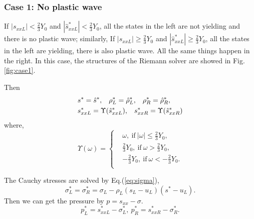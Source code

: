 \documentclass{article}
\numberwithin{equation}{section}
\numberwithin{table}{section}
\begin{document}
\subsubsection{Case 1: No plastic wave}\label{sec:case1}
%
If $|s_{xxL}|<\frac{2}{3}Y_0$ and $|\hat{s}_{xxL}^*| < \frac{2}{3}Y_0$, all the states in the left are not yielding and there is no plastic wave; similarly, If $|s_{xxL}| \ge \frac{2}{3}Y_0$ and $|\hat{s}_{xxL}^*| \ge  \frac{2}{3}Y_0$, all the states in the left are yielding, there is also plastic wave. All the same things happen in the right.
In this case, the structures  of the Riemann solver are showed in Fig.\ref{fig:case1}.

Then
\begin{align}
&  s^* = \hat{s}^*,\hspace{0.3cm} \rho^*_L = \hat{\rho}_L^*, \hspace{0.3cm} \rho_R^* = \hat{\rho}_R^*,\\
&  s_{xxL}^*  = \Upsilon(\hat{s}_{xxL}^*),\hspace{0.3cm} s_{xxR}^*  = \Upsilon(\hat{s}_{xxR}^*)
\end{align}
where,
\begin{equation}\label{eq:upsilon}
  \Upsilon(\omega) = \left\{ \begin{aligned}
	  &\omega, \  \text{if} \  |\omega| \le \frac{2}{3}Y_0,\\
	  &\frac{2}{3}Y_0,  \ \text{if} \  \omega > \frac{2}{3}Y_0,\\
	 &-\frac{2}{3}Y_0,  \  \text{if} \ \omega < -\frac{2}{3}Y_0.\\
 \end{aligned}\right.
 \end{equation}

 The Cauchy stresses are solved  by Eq.(\ref{eq:sigma}),
\begin{equation*}
  \sigma_L^*=\sigma_R^*=\sigma_L -\rho_L (s_L-u_L)(s^*-u_L).
\end{equation*}
 Then we can get the pressure by $p =s_{xx}-\sigma$.
\begin{equation}
  p_L^* = s_{xxL}^* - \sigma_L^*,  \  p_R^* = s_{xxR}^* - \sigma_R^*.
\end{equation}
\end{document}
